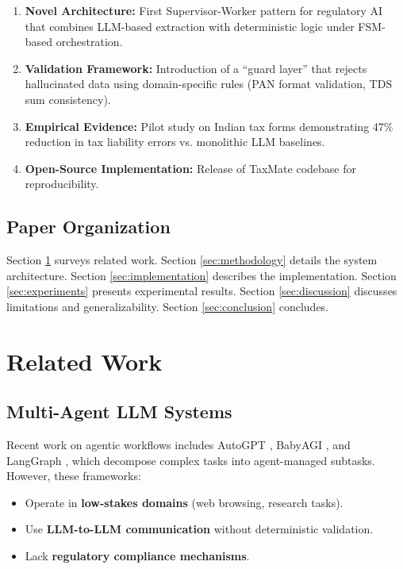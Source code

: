 \documentclass[conference]{IEEEtran}
\begin{document}
\begin{enumerate}
    \item \textbf{Novel Architecture:} First Supervisor-Worker pattern for regulatory AI that combines LLM-based extraction with deterministic logic under FSM-based orchestration.
    \item \textbf{Validation Framework:} Introduction of a ``guard layer'' that rejects hallucinated data using domain-specific rules (PAN format validation, TDS sum consistency).
    \item \textbf{Empirical Evidence:} Pilot study on Indian tax forms demonstrating 47\% reduction in tax liability errors vs. monolithic LLM baselines.
    \item \textbf{Open-Source Implementation:} Release of TaxMate codebase for reproducibility.
\end{enumerate}

\subsection{Paper Organization}

Section \ref{sec:related} surveys related work. Section \ref{sec:methodology} details the system architecture. Section \ref{sec:implementation} describes the implementation. Section \ref{sec:experiments} presents experimental results. Section \ref{sec:discussion} discusses limitations and generalizability. Section \ref{sec:conclusion} concludes.

\section{Related Work}
\label{sec:related}

\subsection{Multi-Agent LLM Systems}

Recent work on agentic workflows includes AutoGPT \cite{richards2023autogpt}, BabyAGI \cite{nakajima2023babyagi}, and LangGraph \cite{langchain2024langgraph}, which decompose complex tasks into agent-managed subtasks. However, these frameworks:

\begin{itemize}
    \item Operate in \textbf{low-stakes domains} (web browsing, research tasks).
    \item Use \textbf{LLM-to-LLM communication} without deterministic validation.
    \item Lack \textbf{regulatory compliance mechanisms}.
\end{itemize}
\end{document}
